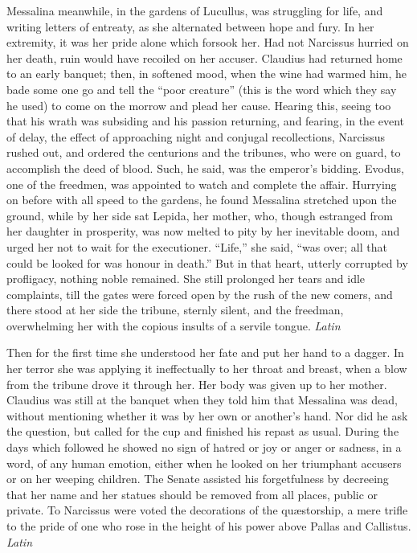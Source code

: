 
Messalina meanwhile, in the gardens of Lucullus, was struggling for life, and writing letters of entreaty, as she alternated between hope and fury. In her extremity, it was her pride alone which forsook her. Had not Narcissus hurried on her death, ruin would have recoiled on her accuser. Claudius had returned home to an early banquet; then, in softened mood, when the wine had warmed him, he bade some one go and tell the ``poor creature'' (this is the word which they say he used) to come on the morrow and plead her cause. Hearing this, seeing too that his wrath was subsiding and his passion returning, and fearing, in the event of delay, the effect of approaching night and conjugal recollections, Narcissus rushed out, and ordered the centurions and the tribunes, who were on guard, to accomplish the deed of blood. Such, he said, was the emperor's bidding. Evodus, one of the freedmen, was appointed to watch and complete the affair. Hurrying on before with all speed to the gardens, he found Messalina stretched upon the ground, while by her side sat Lepida, her mother, who, though estranged from her daughter in prosperity, was now melted to pity by her inevitable doom, and urged her not to wait for the executioner. ``Life,'' she said, ``was over; all that could be looked for was honour in death.'' But in that heart, utterly corrupted by profligacy, nothing noble remained. She still prolonged her tears and idle complaints, till the gates were forced open by the rush of the new comers, and there stood at her side the tribune, sternly silent, and the freedman, overwhelming her with the copious insults of a servile tongue. \emph{Latin}


Then for the first time she understood her fate and put her hand to a dagger. In her terror she was applying it ineffectually to her throat and breast, when a blow from the tribune drove it through her. Her body was given up to her mother. Claudius was still at the banquet when they told him that Messalina was dead, without mentioning whether it was by her own or another's hand. Nor did he ask the question, but called for the cup and finished his repast as usual. During the days which followed he showed no sign of hatred or joy or anger or sadness, in a word, of any human emotion, either when he looked on her triumphant accusers or on her weeping children. The Senate assisted his forgetfulness by decreeing that her name and her statues should be removed from all places, public or private. To Narcissus were voted the decorations of the quæstorship, a mere trifle to the pride of one who rose in the height of his power above Pallas and Callistus. \emph{Latin}

